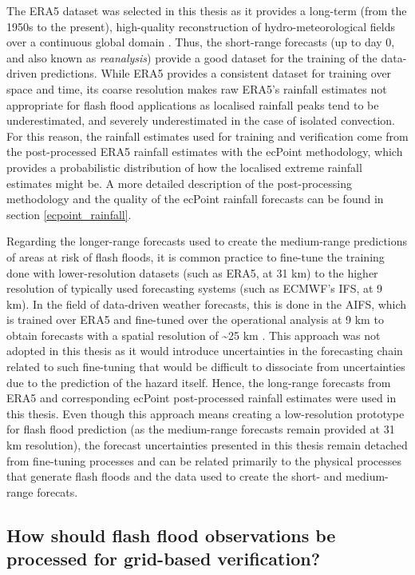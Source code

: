 The ERA5 dataset was selected in this thesis as it provides a long-term (from the 1950s to the present), high-quality reconstruction of hydro-meteorological fields over a continuous global domain \citep{Hersbach_2020}. Thus, the short-range forecasts (up to day 0, and also known as \textit{reanalysis}) provide a good dataset for the training of the data-driven predictions. While ERA5 provides a consistent dataset for training over space and time, its coarse resolution makes raw ERA5's rainfall estimates not appropriate for flash flood applications as localised rainfall peaks tend to be underestimated, and severely underestimated in the case of isolated convection. For this reason, the rainfall estimates used for training and verification come from the post-processed ERA5 rainfall estimates with the ecPoint methodology, which provides a probabilistic distribution of how the localised extreme rainfall estimates might be. A more detailed description of the post-processing methodology and the quality of the ecPoint rainfall forecasts can be found in section \ref{ecpoint_rainfall}.

Regarding the longer-range forecasts used to create the medium-range predictions of areas at risk of flash floods, it is common practice to fine-tune the training done with lower-resolution datasets (such as ERA5, at 31 km) to the higher resolution of typically used forecasting systems (such as ECMWF's IFS, at 9 km). In the field of data-driven weather forecasts, this is done in the AIFS, which is trained over ERA5 and fine-tuned over the operational analysis at 9 km to obtain forecasts with a spatial resolution of \sim25 km  \citep{Lang_2024}. This approach was not adopted in this thesis as it would introduce uncertainties in the forecasting chain related to such fine-tuning that would be difficult to dissociate from uncertainties due to the prediction of the hazard itself. Hence, the long-range forecasts from ERA5 and corresponding ecPoint post-processed rainfall estimates were used in this thesis. Even though this approach means creating a low-resolution prototype for flash flood prediction (as the medium-range forecasts remain provided at 31 km resolution), the forecast uncertainties presented in this thesis remain detached from fine-tuning processes and can be related primarily to the physical processes that generate flash floods and the data used to create the short- and medium-range forecats.

\subsection{How should flash flood observations be processed for grid-based verification?}

